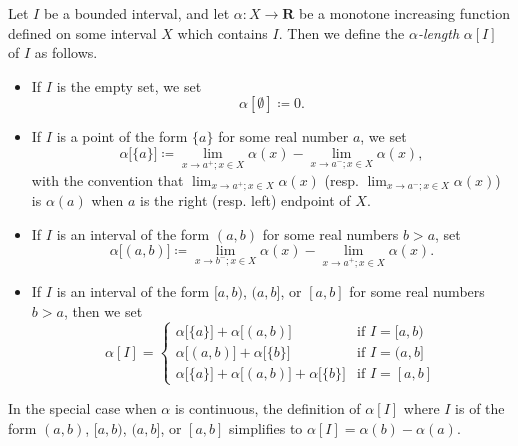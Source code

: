\begin{definition}\label{11.8.1}
    Let \(I\) be a bounded interval, and let \(\alpha : X \to \mathbf{R}\) be a monotone increasing function defined on some interval \(X\) which contains \(I\).
    Then we define the \emph{\(\alpha\)-length} \(\alpha[I]\) of \(I\) as follows.
    \begin{itemize}
        \item If \(I\) is the empty set, we set
              \[
                  \alpha[\emptyset] \coloneqq 0.
              \]
        \item If \(I\) is a point of the form \(\{a\}\) for some real number \(a\), we set
              \[
                  \alpha\big[\{a\}\big] \coloneqq \lim_{x \to a^+ ; x \in X} \alpha(x) - \lim_{x \to a^- ; x \in X} \alpha(x),
              \]
              with the convention that \(\lim_{x \to a^+ ; x \in X} \alpha(x)\) (resp. \(\lim_{x \to a^- ; x \in X} \alpha(x)\)) is \(\alpha(a)\) when \(a\) is the right (resp. left) endpoint of \(X\).
        \item If \(I\) is an interval of the form \((a, b)\) for some real numbers \(b > a\), set
              \[
                  \alpha\big[(a, b)\big] \coloneqq \lim_{x \to b^- ; x \in X} \alpha(x) - \lim_{x \to a^+ ; x \in X} \alpha(x).
              \]
        \item If \(I\) is an interval of the form \([a, b)\), \((a, b]\), or \([a, b]\) for some real numbers \(b > a\), then we set
              \[
                  \alpha[I] = \begin{cases}
                      \alpha\big[\{a\}\big] + \alpha\big[(a, b)\big]                         & \text{if } I = [a, b) \\
                      \alpha\big[(a, b)\big] + \alpha\big[\{b\}\big]                         & \text{if } I = (a, b] \\
                      \alpha\big[\{a\}\big] + \alpha\big[(a, b)\big] + \alpha\big[\{b\}\big] & \text{if } I = [a, b]
                  \end{cases}
              \]
    \end{itemize}
\end{definition}

\begin{note}
    In the special case when \(\alpha\) is continuous, the definition of \(\alpha[I]\) where \(I\) is of the form \((a, b)\), \([a, b)\), \((a, b]\), or \([a, b]\) simplifies to \(\alpha[I] = \alpha(b) - \alpha(a)\).
\end{note}

